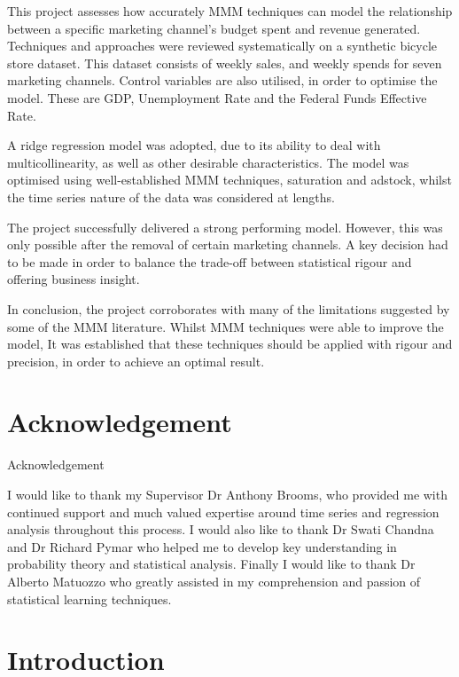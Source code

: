 \documentclass[11pt, a4paper]{article}
\begin{document}
This project assesses how accurately MMM techniques can model the relationship between a specific marketing channel’s budget spent and revenue generated. Techniques and approaches were reviewed systematically on a synthetic bicycle store dataset. This dataset consists of weekly sales, and weekly spends for seven marketing channels. Control variables are also utilised, in order to optimise the model. These are GDP, Unemployment Rate and the Federal Funds Effective Rate. 

A ridge regression model was adopted, due to its ability to deal with multicollinearity, as well as other desirable characteristics. The model was optimised using well-established MMM techniques, saturation and adstock, whilst the time series nature of the data was considered at lengths. 

The project successfully delivered a strong performing model. However, this was only possible after the removal of certain marketing channels. A key decision had to be made in order to balance the trade-off between statistical rigour and offering business insight. 

In conclusion, the project corroborates with many of the limitations suggested by some of the MMM literature. Whilst MMM techniques were able to improve the model, 
It was established that these techniques should be applied with rigour and precision, in order to achieve an optimal result. 

\newpage

\tableofcontents
\newpage
\listoffigures
\newpage
\listoftables


\newpage

\section*{Acknowledgement}
{Acknowledgement}

I would like to thank my Supervisor Dr Anthony Brooms, who provided me with continued support and much valued expertise around time series and regression analysis throughout this process. I would also like to thank Dr Swati Chandna and Dr Richard Pymar who helped me to develop key understanding in probability theory and statistical analysis. Finally I would like to thank Dr Alberto Matuozzo who greatly assisted in my comprehension and passion of statistical learning techniques. 

\newpage

\section{Introduction }
\end{document}
